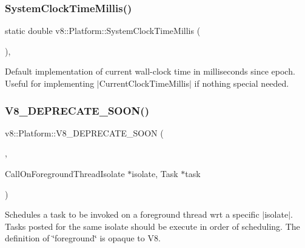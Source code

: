 \subsubsection{\texorpdfstring{System\+Clock\+Time\+Millis()}{SystemClockTimeMillis()}}
{\footnotesize\ttfamily static double v8\+::\+Platform\+::\+System\+Clock\+Time\+Millis (\begin{DoxyParamCaption}{ }\end{DoxyParamCaption})\hspace{0.3cm}{\ttfamily [static]}, {\ttfamily [protected]}}

Default implementation of current wall-\/clock time in milliseconds since epoch. Useful for implementing $\vert$\+Current\+Clock\+Time\+Millis$\vert$ if nothing special needed. \mbox{\label{classv8_1_1Platform_a2a25af03a35d938b37f2378d25ad4c6e}} 
\subsubsection{\texorpdfstring{V8\+\_\+\+D\+E\+P\+R\+E\+C\+A\+T\+E\+\_\+\+S\+O\+O\+N()}{V8\_DEPRECATE\_SOON()}\hspace{0.1cm}{\footnotesize\ttfamily [1/3]}}
{\footnotesize\ttfamily v8\+::\+Platform\+::\+V8\+\_\+\+D\+E\+P\+R\+E\+C\+A\+T\+E\+\_\+\+S\+O\+ON (\begin{DoxyParamCaption}\item[{\char`\"{}Use a taskrunner acquired by \mbox{\hyperlink{classv8_1_1Platform_af0d18c6bbefa133c5d11ec8a460d0278}{Get\+Foreground\+Task\+Runner}} instead.\char`\"{}}]{,  }\item[{virtual void }]{Call\+On\+Foreground\+ThreadIsolate $\ast$isolate, Task $\ast$task }\end{DoxyParamCaption})\hspace{0.3cm}{\ttfamily [pure virtual]}}

Schedules a task to be invoked on a foreground thread wrt a specific $\vert$isolate$\vert$. Tasks posted for the same isolate should be execute in order of scheduling. The definition of \char`\"{}foreground\char`\"{} is opaque to V8. \mbox{\label{classv8_1_1Platform_a7bdd7f9f31ce5fe5c5f0fd8a0e597d04}} 
